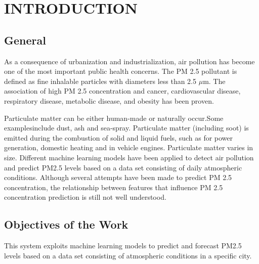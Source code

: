 %       
%
\tableofcontents
{}
\listoffigures
\mainmatter


\chapter {INTRODUCTION}
	
\section{General}    %
As a consequence of urbanization and
industrialization, air pollution has become one of
the most important public health concerns. The
PM 2.5 pollutant is defined as fine inhalable
particles with diameters less than 2.5 $\mu$m. The
association of high PM 2.5 concentration and
cancer, cardiovascular disease, respiratory
disease, metabolic disease, and obesity has been
proven.
\par Particulate matter can be either
human-made or naturally occur.Some examplesinclude dust, ash and sea-spray. Particulate matter
(including soot) is emitted during the combustion
of solid and liquid fuels, such as for power
generation, domestic heating and in vehicle
engines. Particulate matter varies in size.
Different machine learning models have been
applied to detect air pollution and predict PM2.5
levels based on a data set consisting of daily
atmospheric conditions. Although several
attempts have been made to predict PM 2.5
concentration, the relationship between features
that influence PM 2.5 concentration prediction is
still not well understood.
\pagebreak
\section{Objectives of the Work}
This system exploits machine learning models
to predict and forecast PM2.5 levels based on a
data set consisting of atmospheric conditions in a
specific city.\linebreak

